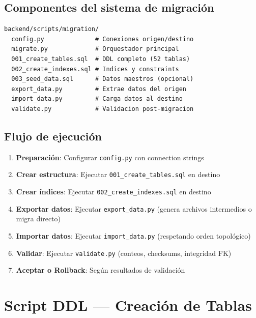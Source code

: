 \documentclass[12pt,a4paper,twoside]{report}
\begin{document}
\section{Componentes del sistema de migraci\'on}

\begin{lstlisting}[style=bashstyle, caption={Estructura de archivos de migraci\'on}]
backend/scripts/migration/
  config.py              # Conexiones origen/destino
  migrate.py             # Orquestador principal
  001_create_tables.sql  # DDL completo (52 tablas)
  002_create_indexes.sql # Indices y constraints
  003_seed_data.sql      # Datos maestros (opcional)
  export_data.py         # Extrae datos del origen
  import_data.py         # Carga datos al destino
  validate.py            # Validacion post-migracion
\end{lstlisting}

\section{Flujo de ejecuci\'on}

\begin{enumerate}
    \item \textbf{Preparaci\'on}: Configurar \texttt{config.py} con connection strings
    \item \textbf{Crear estructura}: Ejecutar \texttt{001\_create\_tables.sql} en destino
    \item \textbf{Crear \'indices}: Ejecutar \texttt{002\_create\_indexes.sql} en destino
    \item \textbf{Exportar datos}: Ejecutar \texttt{export\_data.py} (genera archivos intermedios o migra directo)
    \item \textbf{Importar datos}: Ejecutar \texttt{import\_data.py} (respetando orden topol\'ogico)
    \item \textbf{Validar}: Ejecutar \texttt{validate.py} (conteos, checksums, integridad FK)
    \item \textbf{Aceptar o Rollback}: Seg\'un resultados de validaci\'on
\end{enumerate}

\chapter{Script DDL --- Creaci\'on de Tablas}
\end{document}
